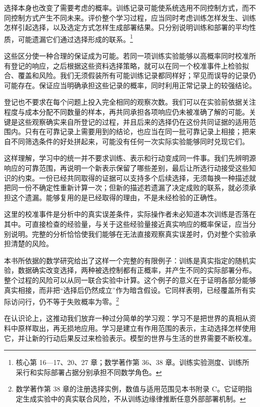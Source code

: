 \documentclass[
  11pt,
  oneside]{book}
\begin{document}
选择本身也改变了需要考虑的概率。训练记录可能使系统选用不同控制方式，而不同控制方式产生不同未来。评价整个学习过程，应当同时考虑训练怎样发生、训练怎样引起选择，以及选定方式怎样生成部署结果。只分别说明训练和部署的平均性质，可能遗漏它们通过选择形成的联系。\footnote{\hypertarget{ph-note-24}{}核心第 16---17、20、27 章；数学著作第 36、38 章。训练实验测度、训练所采行和实际部署占据分别承担不同数学角色。}

这些区分使一种合理的保证成为可能。若同一项训练实验能够以高概率同时校准所有登记的响应，之后根据这些资料选择策略，就可以在同一个校准事件上检验拟合、覆盖和风险。我们无须假装所有可能训练记录都同样好；罕见而误导的记录仍可能存在。保证应当明确承担这些记录的概率，同时利用正常记录上的较强结论。

登记也不要求在每个问题上投入完全相同的观察次数。我们可以在实验前依据关注程度与成本分配不同数量的样本，再共同承担各项响应仍未被准确了解的可能。关键是这些观察确实来自所登记的过程，并且后来的选择仍在这份共同证据的适用范围内。只有在可靠记录上需要用到的结论，也应当在同一批可靠记录上相接；把来自不同筛选条件的好处拼起来，可能没有任何一次实际实验能够同时兑现它们。

这样理解，学习中的统一并不要求训练、表示和行动变成同一件事。我们先辨明源响应的可靠范围，再说明一个新表示保留了哪些差别，最后让所选行动接受这些知识的约束。一份已经共同取得的证据可以支持多个后续选择，无须每换一种描述就把同一份不确定性重新计算一次；但新的描述若遗漏了决定成败的联系，就必须承担这个遗漏。能够复用的是已经取得的理由，不是未经检验的正确性。

这里的校准事件是分析中的真实误差条件，实际操作者未必知道本次训练是否落在其中。可直接检查的经验量，与关于这些经验量接近真实响应的概率保证，应当分别说明。完整的分析恰恰使我们能够在无法直接观察真实误差时，仍对整个实验承担清楚的风险。

本书所依据的数学研究给出了这样一个完整的有限例子：训练是真实指定的随机实验，数据确实改变选择，两种被选控制都有正概率，并产生不同的实际部署分布。整个过程的风险可以从同一联合实验中计算。这个例子的意义在于证明各部分能够真实相接，而非把``选择后仍然成立''作为暗含假设。它同样表明，已经覆盖所有实际访问行，仍不等于失败概率为零。\footnote{\hypertarget{ph-note-25}{}数学著作第 38 章的注册选择实例，数值与适用范围见本书附录 C。它证明指定生成实验中的真实联合风险，不从训练边缘律推断任意外部部署机制。}

在认识论上，这推动我们放弃一种过分简单的学习观：学习不是把世界的真相从资料中原样取出，再无损地应用。学习是建立有作用范围的表示，主动选择怎样使用它，并让新的行动后果反过来检验表示。模型的世界与生活的世界需要不断校准。
\end{document}
